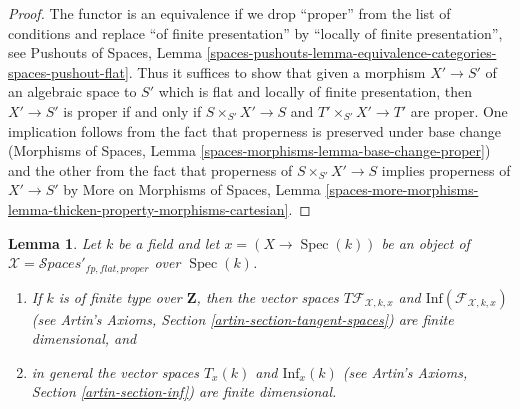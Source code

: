 \documentclass{stacks-project}
\theoremstyle{plain}
\newtheorem{lemma}[subsection]{Lemma}
\theoremstyle{definition}
\theoremstyle{remark}
\numberwithin{equation}{subsection}
\def\Spec{\mathop{\mathrm{Spec}}}
\def\Spacesstack{\mathcal{S}\!\mathit{paces}}
\begin{document}
\begin{proof}
The functor is an equivalence if we drop ``proper'' from the list
of conditions and replace ``of finite presentation'' by
``locally of finite presentation'', see Pushouts of Spaces, Lemma
\ref{spaces-pushouts-lemma-equivalence-categories-spaces-pushout-flat}.
Thus it suffices to show that given a morphism
$X' \to S'$ of an algebraic space to $S'$ which is
flat and locally of finite presentation, then
$X' \to S'$ is proper if and only if $S \times_{S'} X' \to S$
and $T' \times_{S'} X' \to T'$ are proper.
One implication follows from the fact that
properness is preserved under base change
(Morphisms of Spaces, Lemma \ref{spaces-morphisms-lemma-base-change-proper})
and the other from the fact that properness of $S \times_{S'} X' \to S$
implies properness of $X' \to S'$ by
More on Morphisms of Spaces, Lemma
\ref{spaces-more-morphisms-lemma-thicken-property-morphisms-cartesian}.
\end{proof}

\begin{lemma}
\label{lemma-spaces-tangent-space}
Let $k$ be a field and let $x = (X \to \Spec(k))$ be an object of
$\mathcal{X} = \Spacesstack'_{fp, flat, proper}$ over $\Spec(k)$.
\begin{enumerate}
\item If $k$ is of finite type over $\mathbf{Z}$, then
the vector spaces $T\mathcal{F}_{\mathcal{X}, k, x}$ and
$\text{Inf}(\mathcal{F}_{\mathcal{X}, k, x})$
(see Artin's Axioms, Section \ref{artin-section-tangent-spaces})
are finite dimensional, and
\item in general the vector spaces $T_x(k)$ and $\text{Inf}_x(k)$
(see Artin's Axioms, Section \ref{artin-section-inf})
are finite dimensional.
\end{enumerate}
\end{lemma}
\end{document}
